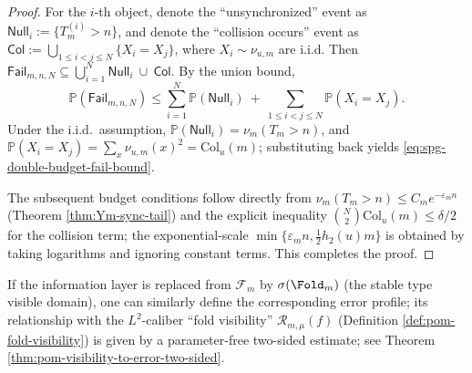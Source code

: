 \begin{proof}
For the \(i\)-th object, denote the ``unsynchronized'' event as \(\mathsf{Null}_i:=\{T_m^{(i)}>n\}\), and denote the ``collision occurs'' event as
\(
\mathsf{Col}:=\bigcup_{1\le i<j\le N}\{X_i=X_j\}
\), where \(X_i\sim\nu_{u,m}\) are i.i.d.
Then
\(
\mathsf{Fail}_{m,n,N}\subseteq \bigcup_{i=1}^N \mathsf{Null}_i\ \cup\ \mathsf{Col}
\).
By the union bound,
\[
\mathbb{P}(\mathsf{Fail}_{m,n,N})
\le
\sum_{i=1}^N \mathbb{P}(\mathsf{Null}_i)
\ +\
\sum_{1\le i<j\le N}\mathbb{P}(X_i=X_j).
\]
Under the i.i.d.\ assumption, \(\mathbb{P}(\mathsf{Null}_i)=\nu_m(T_m>n)\), and
\(
\mathbb{P}(X_i=X_j)=\sum_x\nu_{u,m}(x)^2=\mathrm{Col}_u(m)
\); substituting back yields \eqref{eq:spg-double-budget-fail-bound}.
\par
The subsequent budget conditions follow directly from \(\nu_m(T_m>n)\le C_m e^{-\varepsilon_m n}\) (Theorem \ref{thm:Ym-sync-tail}) and the explicit inequality \(\binom{N}{2}\mathrm{Col}_u(m)\le \delta/2\) for the collision term; the exponential-scale \(\min\{\varepsilon_m n,\tfrac12 h_2(u)m\}\) is obtained by taking logarithms and ignoring constant terms. This completes the proof.
\end{proof}

\begin{remark}\label{rem:spg-visibility-interface}
If the information layer is replaced from $\mathcal{F}_m$ by $\sigma(\Fold_m)$ (the stable type visible domain), one can similarly define the corresponding error profile;
its relationship with the $L^2$-caliber ``fold visibility'' $\mathcal{R}_{m,\mu}(f)$ (Definition \ref{def:pom-fold-visibility}) is given by a parameter-free two-sided estimate; see Theorem \ref{thm:pom-visibility-to-error-two-sided}.
\end{remark}
